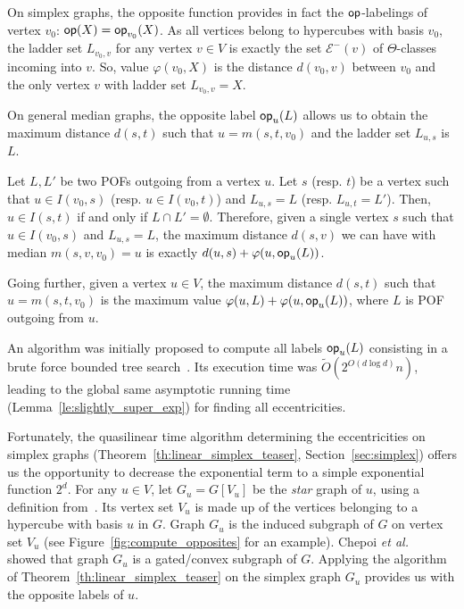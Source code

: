 \documentclass[a4paper,UKenglish,numberwithinsect,cleveref, autoref]{lipics-v2021}
\newcommand{\opp}{\mbox{\textsf{op}}}
\begin{document}
On simplex graphs, the opposite function provides in fact the $\opp$-labelings of vertex $v_0$: $\opp(X) = \opp_{v_0}(X)$. 
As all vertices belong to hypercubes with basis $v_0$, the ladder set $L_{v_0,v}$ for any vertex $v\in V$ is exactly the set $\mathcal{E}^-(v)$ of $\Theta$-classes incoming into $v$. So, value $\varphi(v_0,X)$ is the distance $d(v_0,v)$ between $v_0$ and the only vertex $v$ with ladder set $L_{v_0,v} = X$.

On general median graphs, the opposite label $\opp_u(L)$ allows us to obtain the maximum distance $d(s,t)$ such that $u = m(s,t,v_0)$ and the ladder set $L_{u,s}$ is $L$.

\begin{lemma}
Let $L,L'$ be two POFs outgoing from a vertex $u$. Let $s$ (resp. $t$) be a vertex such that $u \in I(v_0,s)$ (resp. $u \in I(v_0,t)$) and $L_{u,s} = L$ (resp. $L_{u,t} = L'$). Then, $u \in I(s,t)$ if and only if $L \cap L' = \emptyset$. Therefore, given a single vertex $s$ such that $u \in I(v_0,s)$ and $L_{u,s} = L$, the maximum distance $d(s,v)$ we can have with median $m(s,v,v_0) = u$ is exactly $d(u,s)+\varphi(u,\opp_u(L))$.
\label{le:property_opp}
\end{lemma}

Going further, given a vertex $u \in V$, the maximum distance $d(s,t)$ such that $u = m(s,t,v_0)$ is the maximum value $\varphi(u,L) + \varphi(u,\opp_u(L))$, where $L$ is POF outgoing from $u$.

An algorithm was initially proposed to compute all labels $\opp_u(L)$ consisting in a brute force bounded tree search~\cite{BeHa21}. Its execution time was $\tilde{O}(2^{O(d\log d)}n)$, leading to the global same asymptotic running time (Lemma~\ref{le:slightly_super_exp}) for finding all eccentricities.

Fortunately, the quasilinear time algorithm determining the eccentricities on simplex graphs (Theorem~\ref{th:linear_simplex_teaser}, Section~\ref{sec:simplex}) offers us the opportunity to decrease the exponential term to a simple exponential function $2^d$. For any $u \in V$, let $G_u =  G\left[V_u\right]$ be the \textit{star} graph of $u$, using a definition from~\cite{ChLaRa19}. Its vertex set $V_u$ is made up of the vertices belonging to a hypercube with basis $u$ in $G$. Graph $G_u$ is the induced subgraph of $G$ on vertex set $V_u$ (see Figure~\ref{fig:compute_opposites} for an example). Chepoi {\em et al.}~\cite{ChLaRa19} showed that graph $G_u$ is a gated/convex subgraph of $G$. 
Applying the algorithm of Theorem~\ref{th:linear_simplex_teaser} on the simplex graph $G_u$ provides us with the opposite labels of $u$.
\end{document}

